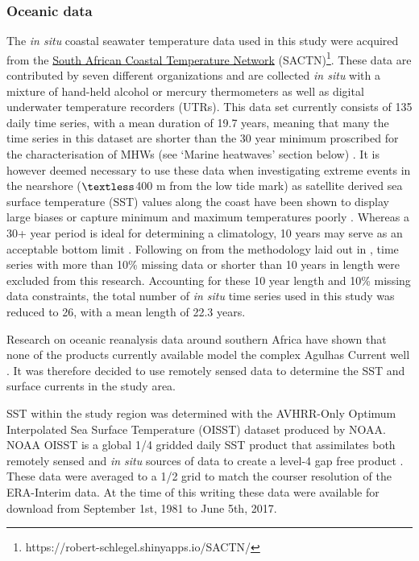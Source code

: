 \documentclass[utf8]{frontiersSCNS}
\begin{document}
\subsubsection{Oceanic data}
The \emph{in situ} coastal seawater temperature data used in this study were acquired from the \href{https://github.com/ajsmit/SACTN}{South African Coastal Temperature Network} (SACTN)\footnote{https://robert-schlegel.shinyapps.io/SACTN/}. These data are contributed by seven different organizations and are collected \emph{in situ} with a mixture of hand-held alcohol or mercury thermometers as well as digital underwater temperature recorders (UTRs). This data set currently consists of 135 daily time series, with a mean duration of 19.7 years, meaning that many the time series in this dataset are shorter than the 30 year minimum proscribed for the characterisation of MHWs (see `Marine heatwaves' section below) \citep{Hobday2016}. It is however deemed necessary to use these data when investigating extreme events in the nearshore ($\textless$400 m from the low tide mark) as satellite derived sea surface temperature (SST) values along the coast have been shown to display large biases \citep{Smit2013} or capture minimum and maximum temperatures poorly \citep{Smale2009, Castillo2010}. Whereas a 30+ year period is ideal for determining a climatology, 10 years may serve as an acceptable bottom limit \citep{Schlegel2017}. Following on from the methodology laid out in \citet{Schlegel2017}, time series with more than 10\% missing data or shorter than 10 years in length were excluded from this research. Accounting for these 10 year length and 10\% missing data constraints, the total number of \emph{in situ} time series used in this study was reduced to 26, with a mean length of 22.3 years.

Research on oceanic reanalysis data around southern Africa have shown that none of the products currently available model the complex Agulhas Current well \citep{Cooper2014}. It was therefore decided to use remotely sensed data to determine the SST and surface currents in the study area.

SST within the study region was determined with the AVHRR-Only Optimum Interpolated Sea Surface Temperature (OISST) dataset produced by NOAA. NOAA OISST is a global 1/4\degree \: gridded daily SST product that assimilates both remotely sensed and \emph{in situ} sources of data to create a level-4 gap free product \citep{Banzon2016}. These data were averaged to a 1/2\degree \: grid to match the courser resolution of the ERA-Interim data. At the time of this writing these data were available for download from September 1st, 1981 to June 5th, 2017.
\end{document}
